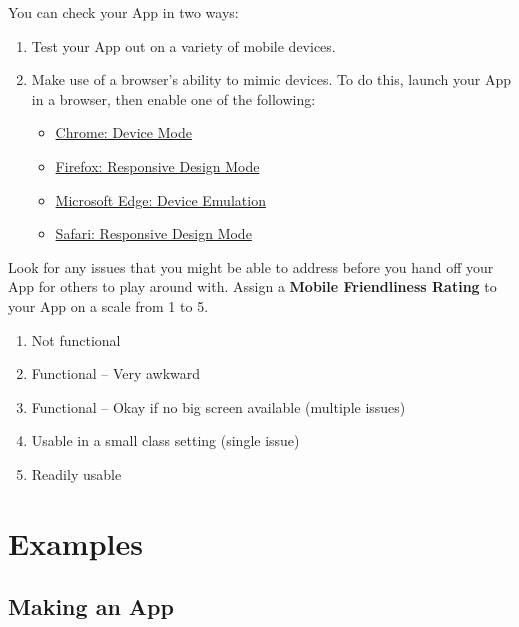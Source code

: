 \documentclass[
]{book}
\providecommand{\tightlist}{%
  \setlength{\itemsep}{0pt}\setlength{\parskip}{0pt}}
\begin{document}
You can check your App in two ways:

\begin{enumerate}
\def\labelenumi{\arabic{enumi}.}
\tightlist
\item
  Test your App out on a variety of mobile devices.
\item
  Make use of a browser's ability to mimic devices. To do this, launch your App in a browser, then enable one of the following:

  \begin{itemize}
  \tightlist
  \item
    \href{https://developers.google.com/web/tools/chrome-devtools/device-mode/\#viewport}{Chrome: Device Mode}
  \item
    \href{https://developer.mozilla.org/en-US/docs/Tools/Responsive_Design_Mode}{Firefox: Responsive Design Mode}
  \item
    \href{https://docs.microsoft.com/en-us/microsoft-edge/devtools-guide/emulation}{Microsoft Edge: Device Emulation}
  \item
    \href{https://support.apple.com/en-gb/guide/safari-developer/dev84bd42758/mac}{Safari: Responsive Design Mode}
  \end{itemize}
\end{enumerate}

Look for any issues that you might be able to address before you hand off your App for others to play around with. Assign a \textbf{Mobile Friendliness Rating} to your App on a scale from 1 to 5.

\begin{enumerate}
\def\labelenumi{\arabic{enumi}.}
\tightlist
\item
  Not functional
\item
  Functional -- Very awkward
\item
  Functional -- Okay if no big screen available (multiple issues)
\item
  Usable in a small class setting (single issue)
\item
  Readily usable
\end{enumerate}

\hypertarget{part-examples}{%
\part{Examples}\label{part-examples}}

\hypertarget{makingApp}{%
\chapter{Making an App}\label{makingApp}}
\end{document}
